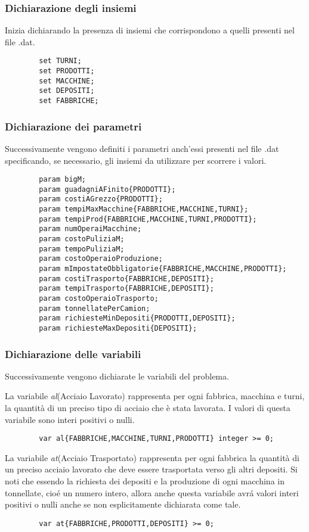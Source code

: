 \documentclass[12pt]{article} %
\begin{document}
	\subsubsection{Dichiarazione degli insiemi}
		Inizia dichiarando la presenza di insiemi che corrispondono a quelli presenti nel file .dat.
		\begin{lstlisting}
		set TURNI; 
		set PRODOTTI; 
		set MACCHINE;
		set DEPOSITI; 
		set FABBRICHE; 
		\end{lstlisting}

	\subsubsection{Dichiarazione dei parametri}
		Successivamente vengono definiti i parametri anch'essi presenti nel file .dat specificando, se necessario, gli insiemi da utilizzare per scorrere i valori.
		\begin{lstlisting}
		param bigM;
		param guadagniAFinito{PRODOTTI}; 
		param costiAGrezzo{PRODOTTI};
		param tempiMaxMacchine{FABBRICHE,MACCHINE,TURNI};
		param tempiProd{FABBRICHE,MACCHINE,TURNI,PRODOTTI}; 
		param numOperaiMacchine; 
		param costoPuliziaM; 
		param tempoPuliziaM;
		param costoOperaioProduzione;
		param mImpostateObbligatorie{FABBRICHE,MACCHINE,PRODOTTI};
		param costiTrasporto{FABBRICHE,DEPOSITI};
		param tempiTrasporto{FABBRICHE,DEPOSITI}; 
		param costoOperaioTrasporto;
		param tonnellatePerCamion;
		param richiesteMinDepositi{PRODOTTI,DEPOSITI}; 
		param richiesteMaxDepositi{DEPOSITI}; 
		\end{lstlisting}

	\subsubsection{Dichiarazione delle variabili}
		Successivamente vengono dichiarate le variabili del problema.

		La variabile \textit{al}(Acciaio Lavorato) rappresenta per ogni fabbrica, macchina e turni, la quantità di un preciso tipo di acciaio che è stata lavorata. I valori di questa variabile sono interi positivi o nulli.
		\begin{lstlisting}
		var al{FABBRICHE,MACCHINE,TURNI,PRODOTTI} integer >= 0;
		\end{lstlisting}

		La variabile \textit{at}(Acciaio Trasportato) rappresenta per ogni fabbrica la quantità di un preciso acciaio lavorato che deve essere trasportata verso gli altri depositi.
		Si noti che essendo la richiesta dei depositi e la produzione di ogni macchina in tonnellate, cio\'e un numero intero, allora anche questa variabile avr\'a valori interi positivi o nulli anche se non esplicitamente dichiarata come tale.
		\begin{lstlisting}
		var at{FABBRICHE,PRODOTTI,DEPOSITI} >= 0;
		\end{lstlisting}
\end{document}
